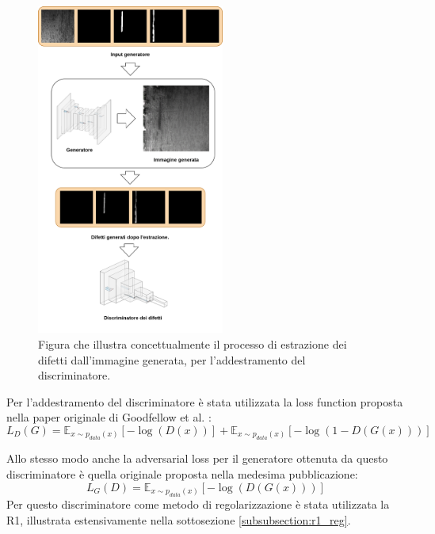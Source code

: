 \begin{figure}[H]
    \centering
    \includegraphics[width=0.55\textwidth]{imgs/Coigan/Defects_discriminator_feed.drawio.png}
    \caption{Figura che illustra concettualmente il processo di estrazione dei difetti dall'immagine generata, per l'addestramento del discriminatore.}
    \label{fig:discriminator_defects_extraction}
\end{figure}

Per l'addestramento del discriminatore è stata utilizzata la loss function proposta nella paper originale di Goodfellow et al. 
\cite{goodfellow2014generative}:
\begin{equation}
    L_{D}(G) = \mathbb{E}_{x \sim p_{data}(x)}[- \log(D(x))] + \mathbb{E}_{x \sim p_{data}(x)}[- \log(1 - D(G(x)))]
    \label{eq:discriminator_loss}
\end{equation}

Allo stesso modo anche la adversarial loss per il generatore ottenuta da questo discriminatore è quella originale
proposta nella medesima pubblicazione:
\begin{equation}
    L_{G}(D) = \mathbb{E}_{x \sim p_{data}(x)}[- \log(D(G(x)))]
    \label{eq:generator_loss}
\end{equation}
Per questo discriminatore come metodo di regolarizzazione è stata utilizzata la R1, illustrata estensivamente nella sottosezione \ref{subsubsection:r1_reg}.

